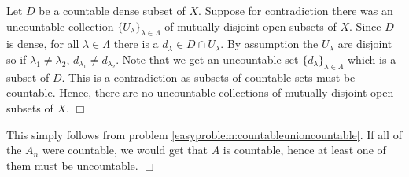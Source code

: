 \documentclass{article}
\begin{document}
 {
    Let $D$ be a countable dense subset of $X$. Suppose for contradiction there was an uncountable collection $\{U_{\lambda}\}_{\lambda\in \Lambda}$ of mutually disjoint open subsets of $X$. Since $D$ is dense, for all $\lambda\in \Lambda$ there is a $d_{\lambda}\in D\cap U_{\lambda}$. By assumption the $U_{\lambda}$ are disjoint so if $\lambda_{1}\neq \lambda_{2}$, $d_{\lambda_{1}}\neq d_{\lambda_{2}}$. Note that we get an uncountable set $\{d_{\lambda}\}_{\lambda\in \Lambda}$ which is a subset of $D$. This is a contradiction as subsets of countable sets must be countable. Hence, there are no uncountable collections of mutually disjoint open subsets of $X$. $\Box$
}

 {
    This simply follows from problem \ref{easyproblem:countableunioncountable}. If all of the $A_{n}$ were countable, we would get that $A$ is countable, hence at least one of them must be uncountable. $\Box$
}
\end{document}
